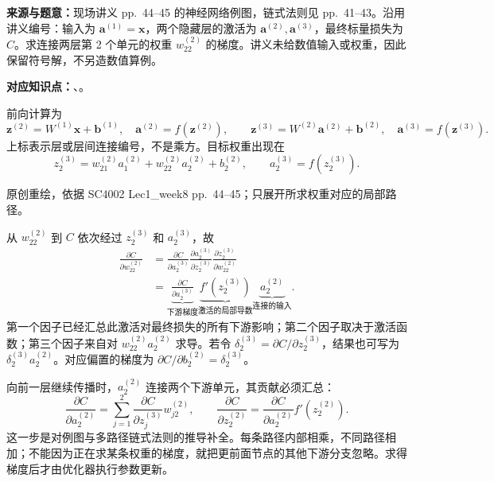 
\textbf{来源与题意：}现场讲义 pp.~44--45 的神经网络例图，链式法则见 pp.~41--43。沿用讲义编号：输入为 $\mathbf a^{(1)}=\mathbf x$，两个隐藏层的激活为 $\mathbf a^{(2)},\mathbf a^{(3)}$，最终标量损失为 $C$。求连接两层第 2 个单元的权重 $w_{22}^{(2)}$ 的梯度。讲义未给数值输入或权重，因此保留符号解，不另造数值算例。

\textbf{对应知识点：}、。

\begin{workedsolution}
前向计算为
\[
  \mathbf z^{(2)}=W^{(1)}\mathbf x+\mathbf b^{(1)},\quad
  \mathbf a^{(2)}=f(\mathbf z^{(2)}),\qquad
  \mathbf z^{(3)}=W^{(2)}\mathbf a^{(2)}+\mathbf b^{(2)},\quad
  \mathbf a^{(3)}=f(\mathbf z^{(3)}).
\]
上标表示层或层间连接编号，不是乘方。目标权重出现在
\[
  z_2^{(3)}=w_{21}^{(2)}a_1^{(2)}+w_{22}^{(2)}a_2^{(2)}+b_2^{(2)},
  \qquad a_2^{(3)}=f(z_2^{(3)}).
\]

\begin{center}


{\small 原创重绘，依据 SC4002 Lec1\_week8 pp.~44--45；只展开所求权重对应的局部路径。}
\end{center}

从 $w_{22}^{(2)}$ 到 $C$ 依次经过 $z_2^{(3)}$ 和 $a_2^{(3)}$，故
\begin{align*}
  \frac{\partial C}{\partial w_{22}^{(2)}}
  &=\frac{\partial C}{\partial a_2^{(3)}}
    \frac{\partial a_2^{(3)}}{\partial z_2^{(3)}}
    \frac{\partial z_2^{(3)}}{\partial w_{22}^{(2)}}\\[3pt]
  &=\underbrace{\frac{\partial C}{\partial a_2^{(3)}}}_{\text{下游梯度}}
    \underbrace{f'(z_2^{(3)})}_{\text{激活的局部导数}}
    \underbrace{a_2^{(2)}}_{\text{连接的输入}}.
\end{align*}
第一个因子已经汇总此激活对最终损失的所有下游影响；第二个因子取决于激活函数；第三个因子来自对 $w_{22}^{(2)}a_2^{(2)}$ 求导。若令 $\delta_2^{(3)}=\partial C/\partial z_2^{(3)}$，结果也可写为 $\delta_2^{(3)}a_2^{(2)}$。对应偏置的梯度为 $\partial C/\partial b_2^{(2)}=\delta_2^{(3)}$。

向前一层继续传播时，$a_2^{(2)}$ 连接两个下游单元，其贡献必须汇总：
\[
  \frac{\partial C}{\partial a_2^{(2)}}
  =\sum_{j=1}^{2}\frac{\partial C}{\partial z_j^{(3)}}w_{j2}^{(2)},
  \qquad
  \frac{\partial C}{\partial z_2^{(2)}}
  =\frac{\partial C}{\partial a_2^{(2)}}f'(z_2^{(2)}).
\]
这一步是对例图与多路径链式法则的推导补全。每条路径内部相乘，不同路径相加；不能因为正在求某条权重的梯度，就把更前面节点的其他下游分支忽略。求得梯度后才由优化器执行参数更新。
\end{workedsolution}
